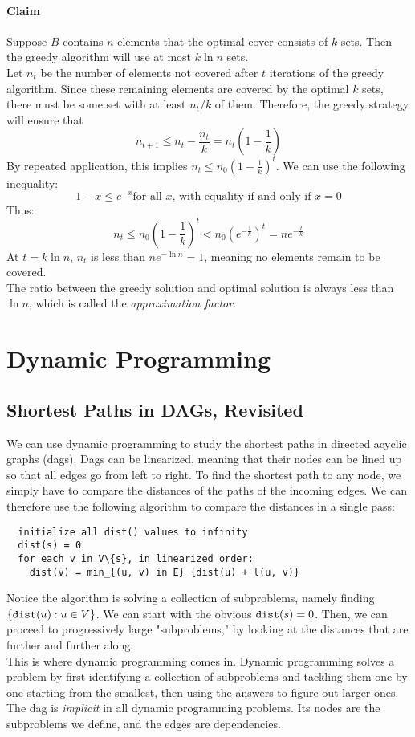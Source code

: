 \paragraph{Claim}
Suppose $B$ contains $n$ elements that the optimal cover consists of $k$ sets.
Then the greedy algorithm will use at most $k \ln n$ sets.\\
Let $n_t$ be the number of elements not covered after $t$ iterations of the greedy algorithm.
Since these remaining elements are covered by the optimal $k$ sets, there must be some set with at least $n_t / k$ of them.
Therefore, the greedy strategy will ensure that $$n_{t+1} \leq n_t - \frac{n_t}{k} = n_t(1 - \frac{1}{k})$$
By repeated application, this implies $n_t \leq n_0 (1 - \frac{1}{k})^t$.
We can use the following inequality: $$1 - x \leq e^{-x} \text{for all $x$, with equality if and only if $x = 0$}$$
Thus: $$n_t \leq n_0(1 - \frac{1}{k})^t < n_0(e^{-\frac{1}{k}})^t = ne^{-\frac{t}{k}}$$
At $t = k \ln n$, $n_t$ is less than $ne^{-\ln n} = 1$, meaning no elements remain to be covered.\\
The ratio between the greedy solution and optimal solution is always less than $\ln n$, which is called the \textit{approximation factor}.

\pagebreak
\section{Dynamic Programming}

\subsection{Shortest Paths in DAGs, Revisited}
We can use dynamic programming to study the shortest paths in directed acyclic graphs (dags).
Dags can be linearized, meaning that their nodes can be lined up so that all edges go from left to right.
To find the shortest path to any node, we simply have to compare the distances of the paths of the incoming edges.
We can therefore use the following algorithm to compare the distances in a single pass:
\begin{verbatim}
  initialize all dist() values to infinity
  dist(s) = 0
  for each v in V\{s}, in linearized order:
    dist(v) = min_{(u, v) in E} {dist(u) + l(u, v)}
\end{verbatim}
Notice the algorithm is solving a collection of subproblems, namely finding $\{\verb|dist|(u) : u \in V\}$.
We can start with the obvious $\verb|dist|(s) = 0$.
Then, we can proceed to progressively large "subproblems," by looking at the distances that are further and further along.\\
This is where dynamic programming comes in.
Dynamic programming solves a problem by first identifying a collection of subproblems and tackling them one by one starting from the smallest, then using the answers to figure out larger ones.
The dag is \textit{implicit} in all dynamic programming problems.
Its nodes are the subproblems we define, and the edges are dependencies.

